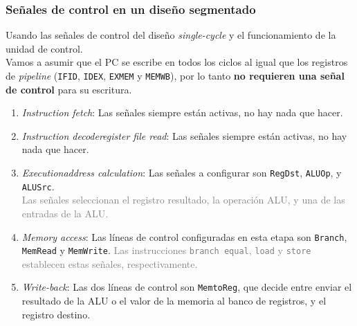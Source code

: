 \documentclass[aspectratio=169]{beamer}
\begin{document}
\begin{frame}[t,fragile]
    \frametitle{Señales de control en un diseño segmentado}
    \small
    Usando las señales de control del diseño \emph{single-cycle} y el funcionamiento de la unidad de control.\\
    \vspace{0.2cm}
    \textcolor{verdeuca}{Vamos a asumir que el PC se escribe en todos los ciclos al igual que los registros de \emph{pipeline} (\texttt{IF\/ID}, \texttt{ID\/EX}, \texttt{EX\/MEM} y \texttt{MEM\/WB}),
    por lo tanto \textbf{no requieren una señal de control} para su escritura.\\}
    \vspace{0.2cm}
    \vspace{0.2cm}
    \begin{enumerate}
    \item<3-> \emph{Instruction fetch}: Las señales siempre están activas, no hay nada que hacer.
    \item<4-> \emph{Instruction decode\/register file read}: Las señales siempre están activas, no hay nada que hacer.
    \item<5-> \emph{Execution\/address calculation}: Las señales a configurar son \texttt{RegDst}, \texttt{ALUOp}, y \texttt{ALUSrc}.\\
    {\scriptsize \textcolor{gray}{Las señales seleccionan el registro resultado, la operación ALU, y una de las entradas de la ALU.}}
    \item<6-> \emph{Memory access}: Las líneas de control configuradas en esta etapa son \texttt{Branch}, \texttt{MemRead} y \texttt{MemWrite}.
    {\scriptsize \textcolor{gray}{Las instrucciones \texttt{branch equal}, \texttt{load} y \texttt{store} establecen estas señales, respectivamente.}}
    \item<7-> \emph{Write-back}: Las dos líneas de control son \texttt{MemtoReg}, que decide entre enviar el resultado de la ALU o el valor de la memoria al banco de registros, y el registro destino.
    \end{enumerate}
\end{frame}
\end{document}

